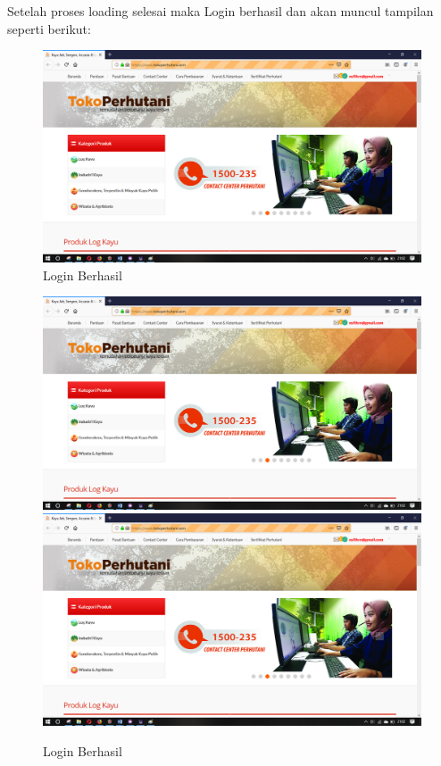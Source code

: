 Setelah proses loading selesai maka Login berhasil dan akan muncul tampilan seperti berikut:
\begin{figure}[h]
 	\centering
 	\includegraphics[scale=0.20]{figures/2login}
 	\caption{Login Berhasil}
\end{figure}
\begin{figure}
 	\includegraphics[scale=0.25]{figures/2login}
 	\includegraphics[scale=0.20]{figures/2login}
 	\caption{Login Berhasil}
\end{figure}


